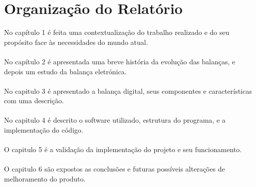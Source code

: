 \section{Organização do Relatório}
No capítulo 1 é feita uma contextualização do trabalho realizado e do seu propósito face às necessidades do mundo atual.
\\
\\
No capítulo 2 é apresentada uma breve história da evolução das balanças, e depois um estudo da balança eletrónica.
\\
\\
No capitulo 3 é apresentado a balança digital, seus componentes e características com uma descrição.
\\
\\
No capitulo 4 é descrito o software utilizado, estrutura do programa, e a implementação do código.
\\
\\
O capitulo 5 é a validação da implementação do projeto e seu funcionamento.
\\
\\
O capitulo 6 são expostos as conclusões e futuras possíveis alterações de melhoramento do produto.
